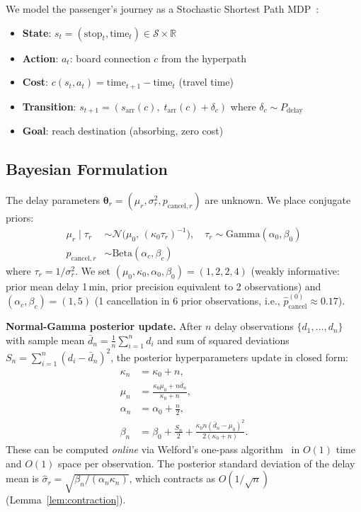 \documentclass[11pt]{article}
\theoremstyle{definition}
\theoremstyle{remark}
\begin{document}
We model the passenger's journey as a Stochastic Shortest Path MDP~\cite{bertsekas1991}:
\begin{itemize}
    \item \textbf{State}: $s_t = (\text{stop}_t, \text{time}_t) \in \mathcal{S} \times \mathbb{R}$
    \item \textbf{Action}: $a_t$: board connection $c$ from the hyperpath
    \item \textbf{Cost}: $c(s_t, a_t) = \text{time}_{t+1} - \text{time}_t$ (travel time)
    \item \textbf{Transition}: $s_{t+1} = (s_{\mathrm{arr}}(c),\; t_{\mathrm{arr}}(c) + \delta_c)$ where $\delta_c \sim P_{\mathrm{delay}}$
    \item \textbf{Goal}: reach destination (absorbing, zero cost)
\end{itemize}

\subsection{Bayesian Formulation}

The delay parameters $\bm{\theta}_r = (\mu_r, \sigma_r^2, p_{\mathrm{cancel},r})$
are unknown.
We place conjugate priors:
\begin{align}
    \mu_r \mid \tau_r &\sim \mathcal{N}\!\bigl(\mu_0,\,(\kappa_0 \tau_r)^{-1}\bigr),
    \quad \tau_r \sim \mathrm{Gamma}(\alpha_0, \beta_0) \label{eq:prior}\\
    p_{\mathrm{cancel},r} &\sim \mathrm{Beta}(\alpha_c, \beta_c) \label{eq:prior_cancel}
\end{align}
where $\tau_r = 1/\sigma_r^2$.
We set $(\mu_0, \kappa_0, \alpha_0, \beta_0) = (1, 2, 2, 4)$
(weakly informative: prior mean delay 1\,min, prior precision
equivalent to 2 observations) and $(\alpha_c, \beta_c) = (1, 5)$
(1 cancellation in 6 prior observations, i.e., $\hat{p}_{\mathrm{cancel}}^{(0)} \approx 0.17$).

\textbf{Normal-Gamma posterior update.}
After $n$ delay observations $\{d_1, \ldots, d_n\}$ with sample mean
$\bar{d}_n = \tfrac{1}{n}\sum_{i=1}^n d_i$ and
sum of squared deviations $S_n = \sum_{i=1}^n(d_i - \bar{d}_n)^2$,
the posterior hyperparameters update in closed form:
\begin{align}
    \kappa_n &= \kappa_0 + n, \label{eq:ng_kappa}\\
    \mu_n    &= \frac{\kappa_0\mu_0 + n\bar{d}_n}{\kappa_0 + n}, \label{eq:ng_mu}\\
    \alpha_n &= \alpha_0 + \tfrac{n}{2}, \label{eq:ng_alpha}\\
    \beta_n  &= \beta_0 + \tfrac{S_n}{2}
               + \frac{\kappa_0 n(\bar{d}_n - \mu_0)^2}{2(\kappa_0+n)}.
               \label{eq:ng_beta}
\end{align}
These can be computed \emph{online} via Welford's one-pass algorithm~\cite{welford1962}
in $O(1)$ time and $O(1)$ space per observation.
The posterior standard deviation of the delay mean is
$\hat\sigma_r = \sqrt{\beta_n / (\alpha_n\kappa_n)}$,
which contracts as $O(1/\sqrt{n})$ (Lemma~\ref{lem:contraction}).
\end{document}
